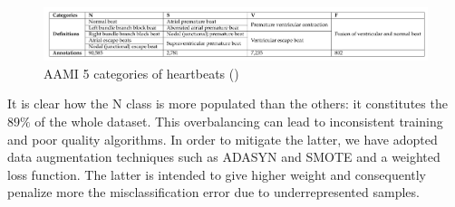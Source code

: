 \documentclass[LaM,binding=0.6cm]{sapthesis}
\begin{document}
\begin{figure}[H]  \centering
    \includegraphics[width=150mm,scale=0.7]{aamiimg}
    \caption{AAMI 5 categories of heartbeats  (\cite{aamistd})}
    \label{fig:aamiimg}
\end{figure}
It is clear how the N class is more populated than the others: it constitutes the $89\%$ of the whole dataset. This overbalancing can lead to inconsistent training and poor quality algorithms. In order to mitigate the latter, we have adopted data augmentation techniques such as ADASYN and SMOTE and a weighted loss function. The latter is intended to give higher weight and consequently penalize more the misclassification error due to underrepresented samples.
\end{document}
